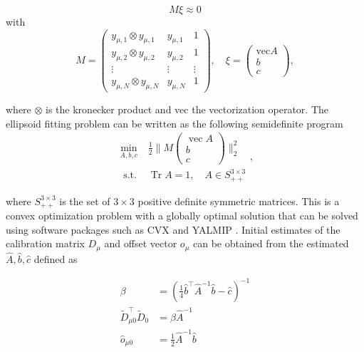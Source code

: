 \begin{equation}
	M \xi \approx 0
\end{equation}
with
\begin{equation}
	M=\left(\begin{array}{ccc}
		y_{\mu, 1} \otimes y_{\mu, 1} & y_{\mu, 1} & 1 \\
		y_{\mu, 2} \otimes y_{\mu, 2} & y_{\mu, 2} & 1 \\
		\vdots & \vdots & \vdots \\
		y_{\mu, N} \otimes y_{\mu, N} & y_{\mu, N} & 1
	\end{array}\right), \quad \xi=\left(\begin{array}{c}
		\mathrm{vec} A \\
		b \\
		c
	\end{array}\right),
\end{equation}

where $\otimes$ is the kronecker product and vec the vectorization operator.
The ellipsoid fitting problem can be written as the following semidefinite program \cite{Kok2016} 
\begin{equation}
	\begin{array}{ll}
		\min _{A, b, c} & \frac{1}{2}\|M\left(\begin{array}{c}
			\operatorname{vec} A \\
			b \\
			c
		\end{array}\right)\|_{2}^{2} \\
		\text { s.t. } & \operatorname{Tr} A=1, \quad A \in S_{++}^{3 \times 3}
	\end{array},
\end{equation}

where $S_{++}^{3 \times 3}$ is the set of $3 \times 3$ positive definite symmetric matrices. This is a convex optimization problem with a globally optimal solution that can be solved using software packages such as CVX \cite{cvx} and YALMIP \cite{Lofberg2004}. Initial estimates of the calibration matrix $D_\mu$ and offset vector $o_\mu$ can be obtained from the estimated $\widehat{A}, \widehat{b}, \widehat{c}$ defined as

\begin{subequations}
	\begin{align}
		\beta &=\left(\frac{1}{4} \hat{b}^{\top} \widehat{A}^{-1} \widehat{b}-\widehat{c}\right)^{-1} \\
		\widetilde{D}_{\mu 0}^{\top} \widetilde{D}_{0} &=\beta \widehat{A}^{-1} \\
		\widehat{o}_{\mu 0} &=\frac{1}{2} \widehat{A}^{-1} \widehat{b}
	\end{align}
\end{subequations}

